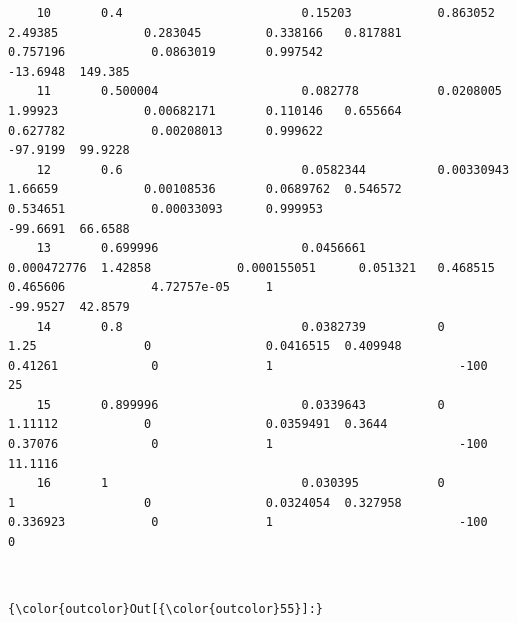 \documentclass[11pt]{article}
\begin{document}
\begin{verbatim}
    10       0.4                         0.15203            0.863052     2.49385            0.283045         0.338166   0.817881                    0.757196            0.0863019       0.997542                   -13.6948  149.385
    11       0.500004                    0.082778           0.0208005    1.99923            0.00682171       0.110146   0.655664                    0.627782            0.00208013      0.999622                   -97.9199  99.9228
    12       0.6                         0.0582344          0.00330943   1.66659            0.00108536       0.0689762  0.546572                    0.534651            0.00033093      0.999953                   -99.6691  66.6588
    13       0.699996                    0.0456661          0.000472776  1.42858            0.000155051      0.051321   0.468515                    0.465606            4.72757e-05     1                          -99.9527  42.8579
    14       0.8                         0.0382739          0            1.25               0                0.0416515  0.409948                    0.41261             0               1                          -100      25
    15       0.899996                    0.0339643          0            1.11112            0                0.0359491  0.3644                      0.37076             0               1                          -100      11.1116
    16       1                           0.030395           0            1                  0                0.0324054  0.327958                    0.336923            0               1                          -100      0
    \end{verbatim}

    
    \begin{Verbatim}[commandchars=\\\{\}]


    \end{Verbatim}

\begin{Verbatim}[commandchars=\\\{\}]
{\color{outcolor}Out[{\color{outcolor}55}]:} 
\end{Verbatim}
            
\end{document}
